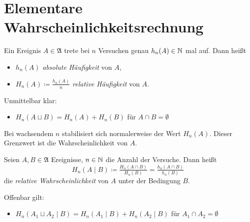 \documentclass{cheat-sheet}
\newcommand{\Alg}{\mathfrak{A}} %
\begin{document}

\section{Elementare Wahrscheinlichkeitsrechnung}


\begin{defn}
  Ein Ereignis $A \in \Alg$ trete bei $n$ Versuchen genau $h_n(A) \in \mathbb{N}$ mal auf. Dann heißt
  \begin{itemize}
    \item $h_n(A)$ \emph{absolute Häufigkeit} von $A$,
    \item $H_n(A) \coloneqq \tfrac{h_n(A)}{n}$ \emph{relative Häufigkeit} von $A$.
  \end{itemize}
\end{defn}

\begin{bem}
  Unmittelbar klar:
  \begin{itemize}
    \item $H_n(A \sqcup B) = H_n(A) + H_n(B)$ für $A \cap B = \emptyset$
  \end{itemize}
\end{bem}

\begin{bem}
  Bei wachsendem $n$ stabilisiert sich normalerweise der Wert $H_n(A)$. Dieser Grenzwert ist die Wahrscheinlichkeit von $A$.
\end{bem}



\begin{defn}
  Seien $A, B \in \Alg$ Ereignisse, $n \in \mathbb{N}$ die Anzahl der Versuche. Dann heißt
  \[ H_n(A \mid B) \coloneqq \tfrac{H_n(A \cap B)}{H_n(B)} = \tfrac{h_n(A \cap B)}{h_n(B)} \]
  die \emph{relative Wahrscheinlichkeit} von $A$ unter der Bedingung $B$.
\end{defn}

\begin{bem}
  Offenbar gilt:
  \begin{itemize}
    \item $H_n(A_1 \sqcup A_2 \mid B) = H_n(A_1 \mid B) + H_n(A_2 \mid B)$ für $A_1 \cap A_2 = \emptyset$
  \end{itemize}
\end{bem}
\end{document}
